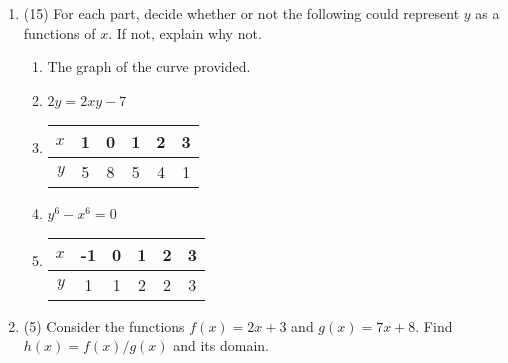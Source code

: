 \documentclass[fleqn]{article}
\begin{document}
\begin{enumerate}
\item (15) For each part, decide whether or not the following could represent $y$ as a functions of $x$. If not, explain why not.
\begin{enumerate}
\item The graph of the curve provided.


\item $2y = 2xy - 7$
\vspace{0.5in}

\item 
\begin{tabular}{r|ccccc}
$x$ & 1 & 0 & 1 & 2 & 3 \\ \hline 
$y$ & 5 & 8 & 5 & 4 & 1 
\end{tabular}
\vspace{0.5in}

\item $y^6 - x^6  = 0$
\vspace{0.5in}

\item 
\begin{tabular}{r|ccccc}
$x$ & -1 & 0 & 1 & 2 & 3 \\ \hline 
$y$ & 1 & 1 & 2 & 2 & 3 
\end{tabular}
\vspace{0.5in}

\end{enumerate}

\item (5) Consider the functions $f(x) = 2x + 3$ and $g(x) = 7x + 8$. Find $h(x) = f(x)/g(x)$ and its domain.
\vspace{1in}


\end{enumerate}
\end{document}
